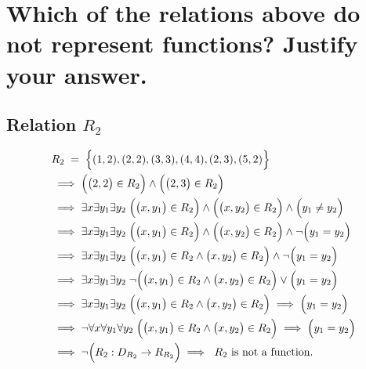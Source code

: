 \documentclass[12pt, letterpaper]{article}
\begin{document}
\color{myColor}

    \section{Which of the relations above do not represent functions? Justify your answer.}

        \subsection{Relation \(R_2\) }
        \vspace{-18pt}
        \begin{align*}
            & R_2 \; = \; \Bigl\{ (1, 2), (2, 2), (3, 3), (4, 4), (2, 3), (5, 2) \Bigr\} \\
            & \implies \Big(\big(2, 2\big) \in R_2\Big) \wedge \Big(\big(2, 3\big) \in R_2\Big) \\ 
            & \implies \exists x \exists y_1 \exists y_2 \; \Big( \big(x, y_1\big) \in R_2 \Big) \wedge
                                                   \Big( \big(x, y_2\big) \in R_2 \Big) \wedge
                                                   \Big( y_1 \neq y_2 \Big) \\
            & \implies \exists x \exists y_1 \exists y_2 \; \Big( \big(x, y_1\big) \in R_2 \Big) \wedge
                                                   \Big( \big(x, y_2\big) \in R_2 \Big) \wedge
                                                   \neg\Big( y_1 = y_2 \Big) \\
            & \implies \exists x \exists y_1 \exists y_2 \; \Big( \big(x, y_1\big) \in R_2 \wedge
                                                   \big(x, y_2\big) \in R_2 \Big) \wedge
                                                   \neg\Big( y_1 = y_2 \Big) \\
            & \implies \exists x \exists y_1 \exists y_2 \; \neg\Big( \big(x, y_1\big) \in R_2 \wedge
                                                   \big(x, y_2\big) \in R_2 \Big) \lor
                                                   \Big( y_1 = y_2 \Big) \\
            & \implies \exists x \exists y_1 \exists y_2 \; \Big( \big(x, y_1\big) \in R_2 \wedge
                                                   \big(x, y_2\big) \in R_2 \Big) \implies
                                                   \Big( y_1 = y_2 \Big) \\
            & \implies \neg\forall x \forall y_1 \forall y_2 \; \Big( \big(x, y_1\big) \in R_2 \wedge
                                                   \big(x, y_2\big) \in R_2 \Big) \implies
                                                   \Big( y_1 = y_2 \Big) \\
            & \implies \neg\Big( R_2 : D_{R_2} \to R_{R_2} \Big)
              \implies \text{ \(R_2\) is not a function.}
        \end{align*}
\end{document}
